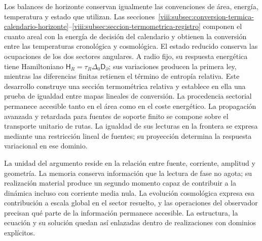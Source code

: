 Los balances de horizonte conservan igualmente las convenciones de
área, energía, temperatura y estado que utilizan.
Las secciones~\ref{viii:subsec:conversion-termica-calendario-horizonte}--\ref{viii:subsec:seccion-termometrica-registro}
componen el cuanto areal con la energía de decisión del calendario y
obtienen la conversión entre las temperaturas cronológica y cosmológica.
El estado reducido conserva las ocupaciones de los dos sectores
angulares. A radio fijo, su respuesta energética tiene Hamiltoniano
\(\mathsf H_R=\tau_R\Delta_0\mathsf D_\partial\); sus variaciones
producen la primera ley, mientras las diferencias finitas retienen
el término de entropía relativa. Este desarrollo construye una sección
termométrica relativa y establece en ella una prueba de igualdad entre
mapas lineales de conversión. La procedencia sectorial permanece
accesible tanto en el área como en el coste energético.
La propagación avanzada y retardada para fuentes de soporte finito se
compone sobre el transporte unitario de rutas. La igualdad de sus lecturas en la frontera se
expresa mediante una restricción lineal de fuentes; su proyección
determina la respuesta variacional en ese dominio.

La unidad del argumento reside en la relación entre fuente, corriente,
amplitud y geometría. La memoria conserva información que la lectura de
fase no agota; su realización material produce un segundo momento capaz
de contribuir a la dinámica incluso con corriente media nula. La
evolución cosmológica expresa esa contribución a escala global en el
sector resuelto, y las operaciones del observador precisan qué parte de
la información permanece accesible. La estructura, la ecuación y su
solución quedan así enlazadas dentro de realizaciones con dominios
explícitos.
